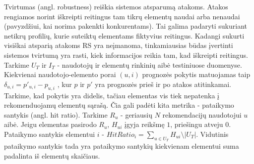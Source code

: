 \documentclass{VUMIFInfMagistrinis}
\begin{document}
Tvirtumas (angl. robustness) reiškia sistemos atsparumą atakoms. Atakos rengiamos norint iškreipti reitingus tam tikrų elementų naudai arba nenaudai (pavyzdžiui, kai norima pakenkti konkurentams). Tai galima padaryti sukuriant netikrų profilių, kurie suteiktų elementams fiktyvius reitingus. Kadangi sukurti visiškai atsparią atakoms RS yra neįmanoma, tinkamiausias būdas įvertinti sistemos tvirtumą yra rasti, kiek informacijos reikia tam, kad iškreipti reitingus. 
\newline
\indent
Tarkime $U_T$ ir $I_T$ - naudotojų ir elementų rinkinių aibė testiniuose duomenyse. Kiekvienai naudotojo-elemento porai $(u,i)$ prognozės pokytis matuojamas taip $\delta_{u,i} = p\prime_{u,i} - p_{u,i}$ , kur $p$ ir $p\prime$ yra prognozės prieš ir po atakos atitinkamai. Tarkime, kad pokytis yra didelis, tačiau elementas vis tiek nepatenka į rekomenduojamų elementų sąrašą. Čia gali padėti kita metrika - pataikymo santykis (angl. hit ratio). Tarkime $R_u$ - geriausių $N$ rekomendacijų naudotojui $u$ aibė. Jeigu elementas pasirodo  $R_u$, $H_{ui}$ įgyja reikšmę $1$, priešingu atveju $0$. Pataikymo santykis elementui $i$ - $HitRatio_i = \sum \limits_{u \in U_T} H_{ui} \setminus |U_T|$. Vidutinis pataikymo santykis tada yra pataikymo santykių kiekvienam elementui suma padalinta iš elementų skaičiaus.






















\newpage
\end{document}
